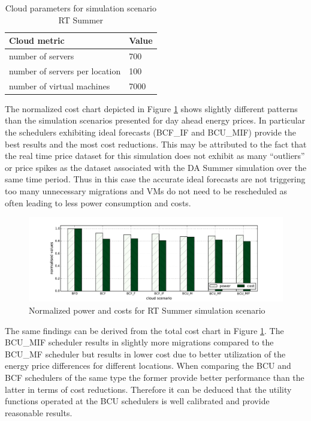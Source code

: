 \begin{table}[htbp]
\centering
\begin{tabular}[\textwidth]{ll}
\toprule
	Cloud metric & Value  \\
\midrule
	number of servers & 700 \\
	number of servers per location & 100 \\
	number of virtual machines & 7000\\
\bottomrule
\end{tabular}
\caption{Cloud parameters for simulation scenario RT Summer}
\label{tab:rt_summer_cloud_parameters}
\end{table}

The normalized cost chart depicted in Figure \ref{fig:RT_Summer_power_vs_cost} shows slightly different patterns than the simulation scenarios presented for day ahead energy prices. In particular the schedulers exhibiting ideal forecasts (BCF\_IF and BCU\_MIF) provide the best results and the most cost reductions. This may be attributed to the fact that the real time price dataset for this simulation does not exhibit as many ``outliers'' or price spikes as the dataset associated with the DA Summer simulation over the same time period. Thus in this case the accurate ideal forecasts are not triggering too many unnecessary migrations and VMs do not need to be rescheduled as often leading to less power consumption and costs. 

\begin{figure}[htbp]
	\centering
		\includegraphics[width=1.00\textwidth]{figures/evaluation_and_results/RT_Summer_power_vs_cost.pdf}
	\caption{Normalized power and costs for RT Summer simulation scenario}
	\label{fig:RT_Summer_power_vs_cost}
\end{figure}

The same findings can be derived from the total cost chart in Figure \ref{fig:RT_Summer_power_vs_cost}. The BCU\_MIF scheduler results in slightly more migrations compared to the BCU\_MF scheduler but results in lower cost due to better utilization of the energy price differences for different locations. When comparing the BCU and BCF schedulers of the same type the former provide better performance than the latter in terms of cost reductions. Therefore it can be deduced that the utility functions operated at the BCU schedulers is well calibrated and provide reasonable results. 

